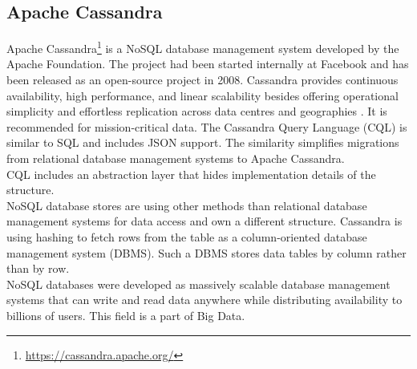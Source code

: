 \subsection{Apache Cassandra}

Apache Cassandra\footnote{\url{https://cassandra.apache.org/}} is a NoSQL database management system developed by the Apache Foundation. The project had been started internally at Facebook and has been released as an open-source project in 2008. Cassandra provides continuous availability, high performance, and linear scalability besides  offering operational simplicity and effortless replication across data centres and geographies \cite{Datastax}. It is recommended for mission-critical data. The Cassandra Query Language (CQL) is similar to SQL and includes JSON support. The similarity simplifies migrations from relational database management systems to Apache Cassandra. \\ 
CQL includes an abstraction layer that hides implementation details of the structure.  \\
NoSQL database stores are using other methods than relational database management systems for data access and own a different structure. Cassandra is using hashing to fetch rows from the table as a column-oriented database management system (DBMS). Such a DBMS stores data tables by column rather than by row. \\ 
NoSQL databases were developed as massively scalable database management systems that can write and read data anywhere while distributing availability to billions of users. This field is a part of Big Data.